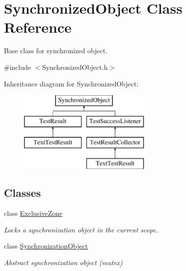 \hypertarget{class_synchronized_object}{\section{Synchronized\-Object Class Reference}
\label{class_synchronized_object}
}


Base class for synchronized object.  




{\ttfamily \#include $<$Synchronized\-Object.\-h$>$}

Inheritance diagram for Synchronized\-Object\-:\begin{figure}[H]
\begin{center}
\leavevmode
\includegraphics[height=4.000000cm]{class_synchronized_object}
\end{center}
\end{figure}
\subsection*{Classes}
\begin{DoxyCompactItemize}
\item 
class \hyperlink{class_synchronized_object_1_1_exclusive_zone}{Exclusive\-Zone}
\begin{DoxyCompactList}\small\item\em Locks a synchronization object in the current scope. \end{DoxyCompactList}\item 
class \hyperlink{class_synchronized_object_1_1_synchronization_object}{Synchronization\-Object}
\begin{DoxyCompactList}\small\item\em Abstract synchronization object (mutex) \end{DoxyCompactList}\end{DoxyCompactItemize}
